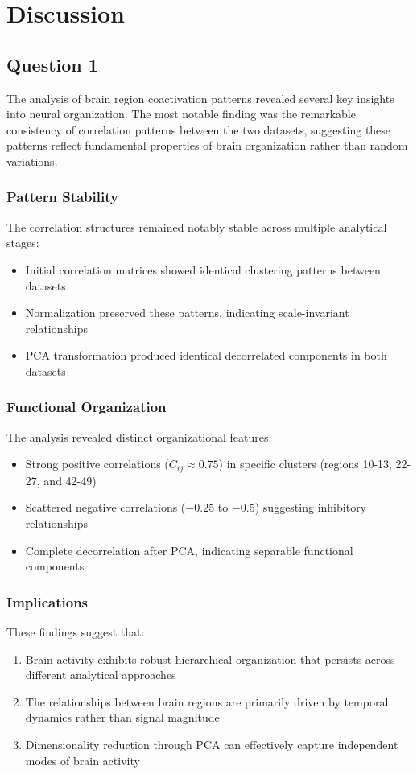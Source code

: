 \documentclass[12pt]{article}
\begin{document}
\section{Discussion}

\subsection{Question 1}
The analysis of brain region coactivation patterns revealed several key insights into neural organization. The most notable finding was the remarkable consistency of correlation patterns between the two datasets, suggesting these patterns reflect fundamental properties of brain organization rather than random variations.

\subsubsection{Pattern Stability}
The correlation structures remained notably stable across multiple analytical stages:
\begin{itemize}
    \item Initial correlation matrices showed identical clustering patterns between datasets
    \item Normalization preserved these patterns, indicating scale-invariant relationships
    \item PCA transformation produced identical decorrelated components in both datasets
\end{itemize}

\subsubsection{Functional Organization}
The analysis revealed distinct organizational features:
\begin{itemize}
    \item Strong positive correlations ($C_{ij} \approx 0.75$) in specific clusters (regions 10-13, 22-27, and 42-49)
    \item Scattered negative correlations ($-0.25$ to $-0.5$) suggesting inhibitory relationships
    \item Complete decorrelation after PCA, indicating separable functional components
\end{itemize}

\subsubsection{Implications}
These findings suggest that:
\begin{enumerate}
    \item Brain activity exhibits robust hierarchical organization that persists across different analytical approaches
    \item The relationships between brain regions are primarily driven by temporal dynamics rather than signal magnitude
    \item Dimensionality reduction through PCA can effectively capture independent modes of brain activity
\end{enumerate}
\end{document}
